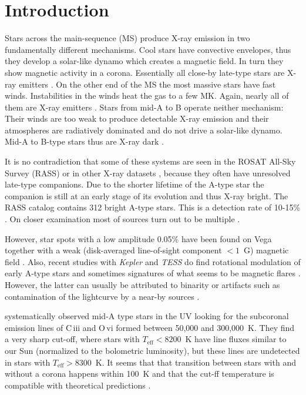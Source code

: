 \documentclass[preprint2]{aastex631}
\begin{document}
\section{Introduction} \label{sec:intro}
Stars across the main-sequence (MS) produce X-ray emission in two fundamentally different mechanisms. Cool stars have convective envelopes, thus they develop a solar-like dynamo which creates a magnetic field. In turn they show magnetic activity in a corona. Essentially all close-by late-type stars are X-ray emitters \citep{2004A&A...417..651S}. On the other end of the MS the most massive stars have fast winds. Instabilities in the winds heat the gas to a few MK. Again, nearly all of them are X-ray emitters \citep{1996A&AS..118..481B,1997A&A...322..167B}. Stars from mid-A to B operate neither mechanism: Their winds are too weak to produce detectable X-ray emission and their atmospheres are radiatively dominated and do not drive a solar-like dynamo. Mid-A to B-type stars thus are X-ray dark \citep{1997A&A...318..215S}.

It is no contradiction that some of these systems are seen in the ROSAT
All-Sky Survey (RASS) or in other X-ray datasets \citep{2020ApJ...902..114W}, because they often have unresolved late-type
companions. Due to the shorter lifetime of the A-type star the companion is
still at an early stage of its evolution and thus X-ray bright. The RASS
catalog contains 312 bright A-type stars. This is a detection rate of 10-15\% \citep{2007A&A...475..677S}. On closer examination most of sources turn out to be multiple \citep{2000A&A...359..227H,2003A&A...407.1067S}.

However, star spots with a low amplitude 0.05\% have been found on Vega \citep{2015A&A...577A..64B} together with a weak (disk-averaged line-of-sight component $< 1$~G) magnetic field \citep{2009A&A...500L..41L,2010A&A...523A..41P}.
Also, recent studies with \emph{Kepler} and \emph{TESS} do find rotational modulation of early A-type stars \citep{2011MNRAS.415.1691B,2017MNRAS.467.1830B,
2019MNRAS.487.4695S} and sometimes signatures of what seems to be magnetic flares \citep{2012MNRAS.423.3420B}. However, the latter can usually be attributed to binarity or artifacts such as contamination of the lightcurve by a near-by sources \citep{2017MNRAS.466.3060P}.

\cite{2002ApJ...579..800S} systematically observed mid-A type stars in the UV
looking for the subcoronal emission lines
of C\,{\sc iii} and O\,{\sc vi} formed between 50,000 and 300,000~K. They find a
very sharp cut-off, where stars with $T_\mathrm{eff}<8200$~K have line fluxes similar to our Sun (normalized to the bolometric
luminosity), but these lines are undetected in stars with $T_\mathrm{eff} > 8300$~K. It seems that that
transition between stars with and without a corona happens within 100~K and that the cut-ff temperature is compatible with theoretical predictions \citep{2000ASPC..210..187C,2002MNRAS.330L...6K}.
\end{document}
